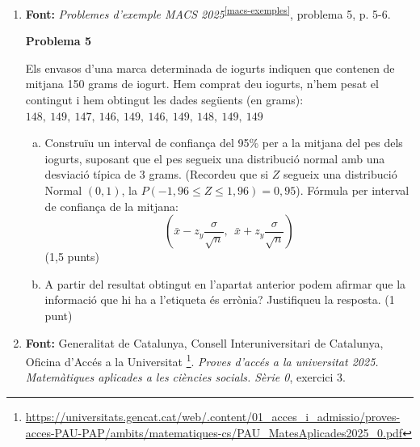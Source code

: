 \begin{enumerate}
 \textbf{Problema 4}

 Volem conèixer el percentatge de persones que parlen anglès en una població determinada. Prenem una mostra aleatòria de 500 persones de les quals resulta que 189 parlen anglès.
 \begin{enumerate}[a)]
  \item Doneu l'estimació puntual de la proporció i del percentatge de persones que parlen anglès en aquella població. (1 punt)
  \item Escriviu un interval de confiança del 95\% per al percentatge de persones que parlen anglès en aquella població. (Recordeu que si $Z$ segueix una distribució Normal $(0,1)$, la $P(-1,96 \leq Z \leq 1,96) = 0,95$). Fórmula per interval de confiança de la proporció: $$\left(\hat{p}-z_y\sqrt{\frac{\hat{p}(1-\hat{p})}{n}}, \ \ \hat{p}+z_y\sqrt{\frac{\hat{p}(1-\hat{p})}{n}}\right)$$ (1,5 punts)
 \end{enumerate}

 \item \textbf{Font:} \textit{Problemes d'exemple MACS 2025}\textsuperscript{\ref{macs-exemples}}, problema 5, p. 5-6.

 \textbf{Problema 5}

 Els envasos d'una marca determinada de iogurts indiquen que contenen de mitjana 150 grams de iogurt. Hem comprat deu iogurts, n'hem pesat el contingut i hem obtingut les dades següents (en grams):
 $148,\ 149,\ 147,\ 146,\ 149,\ 146,\ 149,\ 148,\ 149,\ 149$

 \begin{enumerate}[a)]
  \item Construïu un interval de confiança del 95\% per a la mitjana del pes dels iogurts, suposant que el pes segueix una distribució normal amb una desviació típica de 3 grams. (Recordeu que si $Z$ segueix una distribució Normal $(0,1)$, la $P(-1,96 \leq Z \leq 1,96) = 0,95$). Fórmula per interval de confiança de la mitjana: $$\left(\bar{x}-z_y\frac{\sigma}{\sqrt{n}},\ \ \bar{x}+z_y\frac{\sigma}{\sqrt{n}}\right)$$ (1,5 punts)
  \item A partir del resultat obtingut en l'apartat anterior podem afirmar que la informació que hi ha a l'etiqueta és errònia? Justifiqueu la resposta. (1 punt)
 \end{enumerate}

 \item \textbf{Font:} Generalitat de Catalunya, Consell Interuniversitari de Catalunya, Oficina d'Accés a la Universitat \footnote{\url{https://universitats.gencat.cat/web/.content/01_acces_i_admissio/proves-acces-PAU-PAP/ambits/matematiques-cs/PAU_MatesAplicades2025_0.pdf}}. \textit{Proves d'accés a la universitat 2025. Matemàtiques aplicades a les ciències socials. Sèrie 0}, exercici 3.


\end{enumerate}
